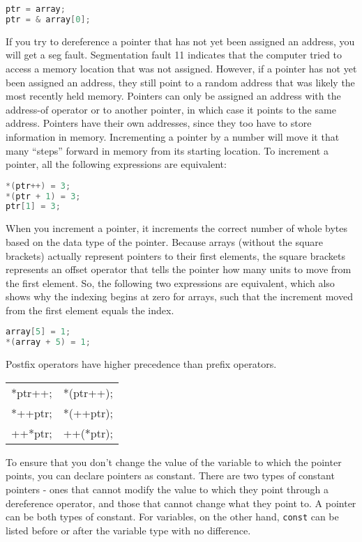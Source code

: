 \documentclass[10pt]{article}
\begin{document}
\begin{lstlisting}[language=C++]
ptr = array;
ptr = & array[0];
\end{lstlisting}

If you try to dereference a pointer that has not yet been assigned an address, you will get a seg fault. Segmentation fault 11 indicates that the computer tried to access a memory location that was not assigned. However, if a pointer has not yet been assigned an address, they still point to a random address that was likely the most recently held memory. Pointers can only be assigned an address with the address-of operator or to another pointer, in which case it points to the same address. Pointers have their own addresses, since they too have to store information in memory. Incrementing a pointer by a number will move it that many ``steps'' forward in memory from its starting location. To increment a pointer, all the following expressions are equivalent:

\begin{lstlisting}[language=C++]
*(ptr++) = 3;
*(ptr + 1) = 3;
ptr[1] = 3;
\end{lstlisting}

When you increment a pointer, it increments the correct number of whole bytes based on the data type of the pointer. Because arrays (without the square brackets) actually represent pointers to their first elements, the square brackets represents an offset operator that tells the pointer how many units to move from the first element. So, the following two expressions are equivalent, which also shows why the indexing begins at zero for arrays, such that the increment moved from the first element equals the index.

\begin{lstlisting}[language=C++]
array[5] = 1;
*(array + 5) = 1;
\end{lstlisting}

Postfix operators have higher precedence than prefix operators.

\begin{center}
\begin{tabular}{l l}
*ptr++; & *(ptr++);\\
*++ptr; & *(++ptr);\\
++*ptr; & ++(*ptr);\\
\end{tabular}
\end{center}

To ensure that you don't change the value of the variable to which the pointer points, you can declare pointers as constant. There are two types of constant pointers - ones that cannot modify the value to which they point through a dereference operator, and those that cannot change what they point to. A pointer can be both types of constant. For variables, on the other hand, \texttt{const} can be listed before or after the variable type with no difference.
\end{document}
